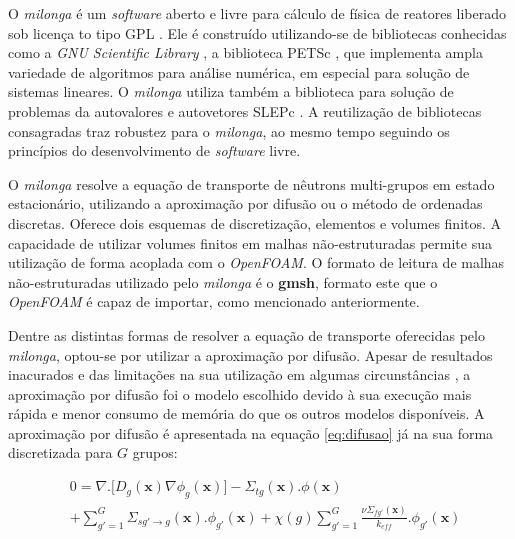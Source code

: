 O \textit{milonga} é um \textit{software} aberto e livre para cálculo de física de reatores
liberado sob licença to tipo GPL \cite{gplv3}. Ele é construído utilizando-se de bibliotecas
conhecidas como a \textit{GNU Scientific Library} \cite{Galassi2009}, a biblioteca
PETSc \cite{Balay2016}, que implementa ampla variedade de algoritmos
para análise numérica, em especial para solução de sistemas lineares.
O \textit{milonga} utiliza também a biblioteca para solução de problemas da autovalores e autovetores
SLEPc \cite{Hernandez2005}. A reutilização de bibliotecas consagradas traz robustez para
o \textit{milonga}, ao mesmo tempo seguindo os princípios do desenvolvimento de \textit{software} livre.

O \textit{milonga} resolve a equação de transporte de nêutrons multi-grupos em estado estacionário,
utilizando a aproximação por difusão ou o método de ordenadas discretas. Oferece dois esquemas
de discretização, elementos e volumes finitos. A capacidade de utilizar volumes finitos em malhas
não-estruturadas permite sua utilização de forma acoplada com o \textit{OpenFOAM}. O formato
de leitura de malhas não-estruturadas utilizado pelo \textit{milonga} é o \textbf{gmsh}, formato
este que o \textit{OpenFOAM} é capaz de importar, como mencionado anteriormente.

Dentre as distintas formas de resolver a equação de transporte oferecidas pelo \textit{milonga},
optou-se por utilizar a aproximação por difusão. Apesar de resultados inacurados e das limitações
na sua utilização em algumas circunstâncias \cite{Trahan2014}, a aproximação por difusão
foi o modelo escolhido devido à sua execução mais rápida e menor consumo de memória do que
os outros modelos disponíveis.
A aproximação por difusão é apresentada na equação \ref{eq:difusao} já na sua forma discretizada
para $G$ grupos:


\begin{equation}
  \label{eq:difusao}
  \begin{split}
  & 0 = \nabla . \big[D_g({\mathbf{x}}) \nabla \phi_g(\mathbf{x})\big] 
- \Sigma_{tg}(\mathbf{x}).\phi(\mathbf{x}) \\
& + \sum_{g'=1}^{G} \Sigma_{sg'\rightarrow g}(\mathbf{x}) . \phi_{g'}(\mathbf{x})
+ \chi(g)  \sum_{g'=1}^{G} \frac{\nu \Sigma_{fg'}(\mathbf{x})}{k_{eff}} . \phi_{g'}(\mathbf{x}) \\
  \end{split}
  \end{equation}

